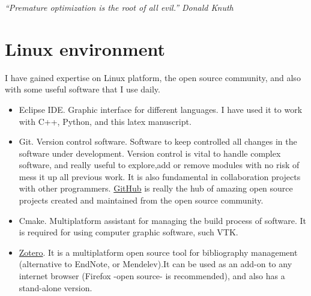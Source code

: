 \emph{``Premature optimization is the root of all evil.'' Donald Knuth}
\section{Linux environment}

I have gained expertise on Linux
platform, the open source community, and also with some useful software that I
use daily.
 
 \begin{itemize}
   \item Eclipse IDE. Graphic interface for different languages. I have used
   it to work with C++, Python, and this latex manuscript.
   \item Git. Version control software. Software to keep controlled all
   changes in the software under development. Version control is vital to handle
   complex software, and really useful to explore,add or remove modules  with no
   risk of mess it up all previous work. It is also fundamental in collaboration
   projects with other programmers. \href{https://github.com/}{GitHub} is really the hub
   of amazing open source projects created and maintained from the open source community.
   \item Cmake. Multiplatform assistant for managing the build process of
   software. It is required for using computer graphic software, such VTK.
   \item \href{http://www.zotero.org/}{Zotero}. It is a multiplatform open
   source tool for bibliography management (alternative to EndNote, or
   Mendelev).It can be used as an add-on to any internet browser (Firefox -open source- is recommended), and also has a 
   stand-alone version.
 

 \end{itemize}
 





